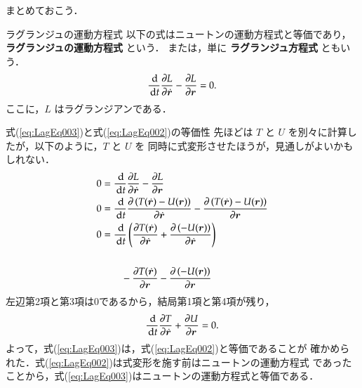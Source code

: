             まとめておこう．
                \begin{myshadebox}{ラグランジュの運動方程式}
                    以下の式はニュートンの運動方程式と等価であり，
                    \textbf{ラグランジュの運動方程式} という．
                    または，単に \textbf{ラグランジュ方程式} ともいう．
                    \begin{align}\label{eq:LagEq003}
                        \frac{\df}{\df t}\frac{\rd L}{\rd \dot{\br}} - \frac{\rd L}{\rd \br} = 0.
                    \end{align}
                    ここに，$L$ はラグランジアンである．
                \end{myshadebox}

        \begin{memo}{式(\ref{eq:LagEq003})と式(\ref{eq:LagEq002})の等価性}
            先ほどは $T$ と $U$ を別々に計算したが，以下のように，$T$ と $U$ を
            同時に式変形させたほうが，見通しがよいかもしれない．
                \begin{align*}
                    0 &= \frac{\,\mathrm{d}}{\,\mathrm{d} t}\frac{\partial L}{\partial \dot{\boldsymbol{r}}} - \frac{\partial L}{\partial \boldsymbol{r}} \notag \\
                    0 &= \frac{\,\mathrm{d}}{\,\mathrm{d} t}\frac{\partial \left( T(\dot{\boldsymbol{r}})- U(\boldsymbol{r}) \right)}{\partial \dot{\boldsymbol{r}}} - \frac{\partial \left( T(\dot{\boldsymbol{r}})- U(\boldsymbol{r}) \right)}{\partial \boldsymbol{r}} \notag \\
                    0 &= \frac{\,\mathrm{d}}{\,\mathrm{d} t}\left(\frac{\partial T(\dot{\boldsymbol{r}})}{\partial \dot{\boldsymbol{r}}} + \frac{\partial \left( - U(\boldsymbol{r}) \right)}{\partial \dot{\boldsymbol{r}}} \right) \\ \notag \\
                      &\qquad - \frac{\partial T(\dot{\boldsymbol{r}})}{\partial \boldsymbol{r}} - \frac{\partial \left( - U(\boldsymbol{r}) \right)}{\partial \boldsymbol{r}}
                \end{align*}
            左辺第2項と第3項は0であるから，結局第1項と第4項が残り，
                \begin{equation*}
                    \frac{\,\mathrm{d}}{\,\mathrm{d} t}\frac{\partial T}{\partial \dot{\boldsymbol{r}}} + \frac{\partial U}{\partial \boldsymbol{r}} = 0.
                \end{equation*}
            よって，式(\ref{eq:LagEq003})は，式(\ref{eq:LagEq002})と等価であることが
            確かめられた．式(\ref{eq:LagEq002})は式変形を施す前はニュートンの運動方程式
            であったことから，式(\ref{eq:LagEq003})はニュートンの運動方程式と等価である．
        \end{memo}


